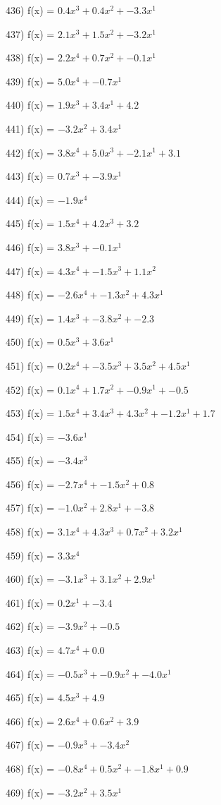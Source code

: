 \documentclass[10pt,a4paper]{article}
\begin{document}
436) f(x) = $0.4x^3 + 0.4x^2 + -3.3x^1$

437) f(x) = $2.1x^3 + 1.5x^2 + -3.2x^1$

438) f(x) = $2.2x^4 + 0.7x^2 + -0.1x^1$

439) f(x) = $5.0x^4 + -0.7x^1$

440) f(x) = $1.9x^3 + 3.4x^1 + 4.2$

441) f(x) = $-3.2x^2 + 3.4x^1$

442) f(x) = $3.8x^4 + 5.0x^3 + -2.1x^1 + 3.1$

443) f(x) = $0.7x^3 + -3.9x^1$

444) f(x) = $-1.9x^4$

445) f(x) = $1.5x^4 + 4.2x^3 + 3.2$

446) f(x) = $3.8x^3 + -0.1x^1$

447) f(x) = $4.3x^4 + -1.5x^3 + 1.1x^2$

448) f(x) = $-2.6x^4 + -1.3x^2 + 4.3x^1$

449) f(x) = $1.4x^3 + -3.8x^2 + -2.3$

450) f(x) = $0.5x^3 + 3.6x^1$

451) f(x) = $0.2x^4 + -3.5x^3 + 3.5x^2 + 4.5x^1$

452) f(x) = $0.1x^4 + 1.7x^2 + -0.9x^1 + -0.5$

453) f(x) = $1.5x^4 + 3.4x^3 + 4.3x^2 + -1.2x^1 + 1.7$

454) f(x) = $-3.6x^1$

455) f(x) = $-3.4x^3$

456) f(x) = $-2.7x^4 + -1.5x^2 + 0.8$

457) f(x) = $-1.0x^2 + 2.8x^1 + -3.8$

458) f(x) = $3.1x^4 + 4.3x^3 + 0.7x^2 + 3.2x^1$

459) f(x) = $3.3x^4$

460) f(x) = $-3.1x^3 + 3.1x^2 + 2.9x^1$

461) f(x) = $0.2x^1 + -3.4$

462) f(x) = $-3.9x^2 + -0.5$

463) f(x) = $4.7x^4 + 0.0$

464) f(x) = $-0.5x^3 + -0.9x^2 + -4.0x^1$

465) f(x) = $4.5x^3 + 4.9$

466) f(x) = $2.6x^4 + 0.6x^2 + 3.9$

467) f(x) = $-0.9x^3 + -3.4x^2$

468) f(x) = $-0.8x^4 + 0.5x^2 + -1.8x^1 + 0.9$

469) f(x) = $-3.2x^2 + 3.5x^1$
\end{document}
